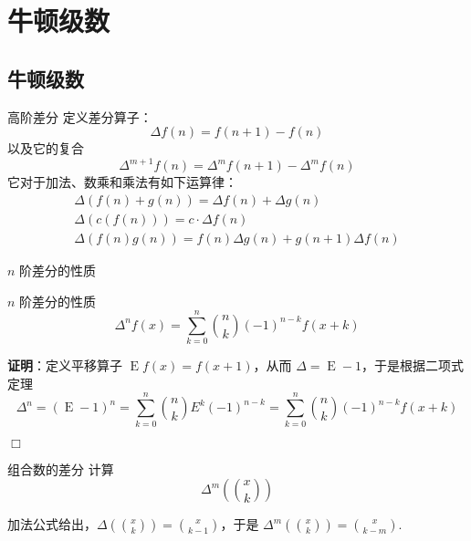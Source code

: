 \documentclass[UTF8]{beamer}
\begin{document}
    \section{牛顿级数}
    \subsection{牛顿级数}
    \begin{frame}{高阶差分}
        定义差分算子：
        $$
        \Delta f(n)=f(n+1)-f(n)
        $$
        以及它的复合
        $$
        \Delta^{m+1}f(n)=\Delta^m f(n+1)-\Delta^m f(n)
        $$
        \pause
        它对于加法、数乘和乘法有如下运算律：
        \begin{gather*}
        \Delta(f(n)+g(n))=\Delta f(n)+\Delta g(n)\\
        \Delta (c(f(n)))=c\cdot \Delta f(n)\\
        \Delta(f(n)g(n)) = f(n)\Delta g(n)+g(n+1)\Delta f(n)
        \end{gather*}
    \end{frame}

    \begin{frame}{$n$ 阶差分的性质}
        \begin{block}{$n$ 阶差分的性质}
            \vspace{-1em}
            $$
            \Delta ^n f(x)=\sum_{k=0}^n\binom{n}{k}(-1)^{n-k}f(x+k)
            $$
            \vspace{-1em}
        \end{block}
        \pause
        \textbf{证明}：定义平移算子 $\operatorname{E} f(x) = f(x+1)$，从而 $\Delta=\operatorname{E}-1$，于是根据二项式定理
        $$
        \Delta^n = (\operatorname E-1)^n=\sum_{k=0}^n\binom{n}{k}E^k(-1)^{n-k}=\sum_{k=0}^n\binom{n}{k}(-1)^{n-k}f(x+k)
        $$

        \vspace{-3em}
        \hfill $\Box$
        \pause

        \vspace{1.5em}
        \begin{block}{组合数的差分}
            计算
            \vspace{-1em}
            $$
            \Delta^m \left(\binom{x}{k}\right)
            $$
            \vspace{-1em}
        \end{block}
        \pause
        加法公式给出，$\displaystyle \Delta \left(\binom{x}{k}\right)=\binom{x}{k-1}$，于是 $\displaystyle \Delta^m \left(\binom{x}{k}\right)=\binom{x}{k-m}.$
    \end{frame}
\end{document}
